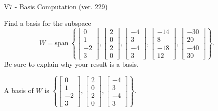 \begin{exercise}
  \begin{exerciseTitle}V7 - Basis Computation (ver. 229)\end{exerciseTitle}
  \begin{exerciseStatement}
    Find a basis for the subspace 
\[W=\mathrm{span}\ \left\{\left[\begin{array}{r}
0 \\
1 \\
-2 \\
3
\end{array}\right] , \left[\begin{array}{r}
2 \\
0 \\
2 \\
0
\end{array}\right] , \left[\begin{array}{r}
-4 \\
3 \\
-4 \\
3
\end{array}\right] , \left[\begin{array}{r}
-14 \\
8 \\
-18 \\
12
\end{array}\right] , \left[\begin{array}{r}
-30 \\
20 \\
-40 \\
30
\end{array}\right]\right\}.\]
 Be sure to explain why your result is a basis.


  \end{exerciseStatement}
  \begin{exerciseAnswer}
   A basis of \(W\) is  \(\left\{\left[\begin{array}{r}
0 \\
1 \\
-2 \\
3
\end{array}\right] , \left[\begin{array}{r}
2 \\
0 \\
2 \\
0
\end{array}\right] , \left[\begin{array}{r}
-4 \\
3 \\
-4 \\
3
\end{array}\right]\right\}\).
  


  \end{exerciseAnswer}
\end{exercise}